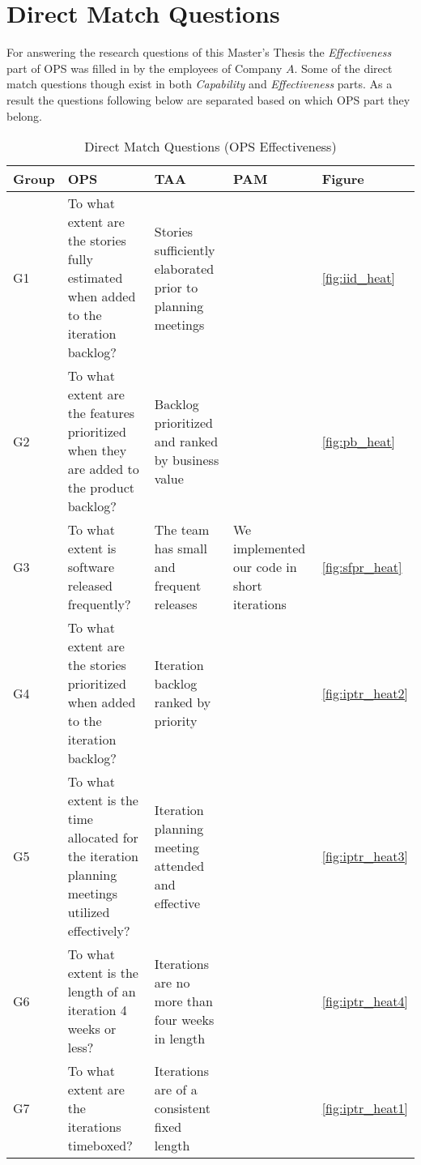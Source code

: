 \chapter{Direct Match Questions}
\label{ch:direct_match_questions}

For answering the research questions of this Master's Thesis the \textit{Effectiveness} part of \ac{OPS} was filled in by the employees of Company $A$. Some of the direct match questions though exist in both \textit{Capability} and \textit{Effectiveness} parts. As a result the questions following below are separated based on which \ac{OPS} part they belong.

\begin{longtable} {| p{1.5cm} | p{3.6cm} | p{3.6cm} | p{3cm} | p{1.1cm} |} \caption{Direct Match Questions (OPS Effectiveness)} \\ \hline
	\label{table:direct_match_table_effectiveness} 	
		\textbf{Group} & \textbf{OPS} & \textbf{TAA}  & \textbf{PAM} & \textbf{Figure}\\ \hline \endhead
		\label{G1} G1 & To what extent are the stories fully estimated when added to the iteration backlog? & Stories sufficiently elaborated prior to planning meetings & & \ref{fig:iid_heat} \\ \hline
		\label{G2} G2 & To what extent are the features prioritized when they are added to the product backlog? & Backlog prioritized and ranked by business value & & \ref{fig:pb_heat} \\ \hline
		\label{G3} G3 & To what extent is software released frequently? & The team has small and frequent releases & We implemented our code in short iterations & \ref{fig:sfpr_heat} \\ \hline
		\label{G4} G4 & To what extent are the stories prioritized when added to the iteration backlog? & Iteration backlog ranked by priority & & \ref{fig:iptr_heat2} \\ \hline
		\label{G5} G5 & To what extent is the time allocated for the iteration planning meetings utilized effectively? & Iteration planning meeting attended and effective & & \ref{fig:iptr_heat3}\\ \hline
		\label{G6} G6 & To what extent is the length of an iteration 4 weeks or less? & Iterations are no more than four weeks in length & & \ref{fig:iptr_heat4} \\ \hline
		\label{G7} G7 & To what extent are the iterations timeboxed? & Iterations are of a consistent fixed length &  & \ref{fig:iptr_heat1} \\ \hline

\end{longtable}
